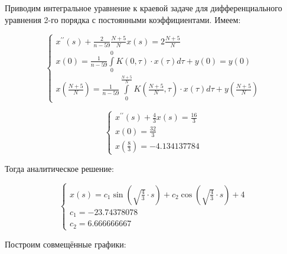 \documentclass[14pt,a4paper]{scrartcl}
\begin{document}
Приводим интегральное уравнение к краевой задаче для дифференциального уравнения 2-го порядка с постоянными коэффициентами. Имеем:

\begin{equation*}
	\left\{\begin{array}{l}x^{\prime \prime}(s)+\frac{2}{n-59} \frac{N+5}{N} x(s)=2 \frac{N+5}{N} \\ 
	x(0)=\frac{1}{n-59} \int\limits_{0}^{0} K(0, \tau) \cdot x(\tau) d \tau+y(0)=y(0) \\ 
	x\left(\frac{N+5}{N}\right)=\frac{1}{n-59} \int\limits_{0}^{\frac{N+5}{N}} K\left(\frac{N+5}{N}, \tau\right) \cdot x(\tau) d \tau+y\left(\frac{N+5}{N}\right)\end{array}\right.
\end{equation*}

\begin{equation*}
	\begin{cases}
		x^{\prime \prime}(s) + \frac{4}{3} x(s) = \frac{16}{3} \\
		x(0) = \frac{32}{3}\\
		x(\frac{8}{3}) = -4.134137784
	\end{cases}
\end{equation*}


Тогда аналитическое решение:

\begin{equation*}
	\begin{cases}
		x(s) = c_1 \sin(\sqrt{\frac{4}{3}} \cdot s) + c_2 \cos(\sqrt{\frac{4}{3}} \cdot s) + 4\\
		c_1 = -23.74378078\\
		c_2 = 6.666666667
	\end{cases}
\end{equation*}


Построим совмещённые графики:

\begin{figure}[H]
	\begin{minipage}[h]{1\linewidth}
		  \\
	\end{minipage}
\end{figure}
\end{document}
